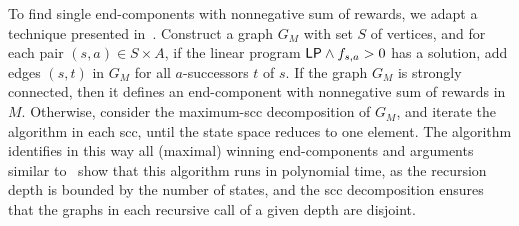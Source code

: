\documentclass{article}
\newcommand{\LP}{{\sf LP}}
\begin{document}
\smallskip{}
To find single end-components with nonnegative sum of rewards, we adapt a 
technique presented in~\cite[Section~3]{KS88}. Construct a graph $G_M$ with set $S$ of vertices,
and for each pair $(s,a) \in S \times A$, if the linear program $\LP \land f_{s,a} > 0$ 
has a solution, add edges $(s,t)$ in $G_M$ for all $a$-successors $t$ of $s$.   If the graph $G_M$ is strongly connected, then it defines an end-component with nonnegative
sum of rewards in $M$. Otherwise, consider the maximum-scc decomposition of $G_M$, 
and iterate the algorithm in each scc, until the state space reduces to one element. 
The algorithm identifies in this way all (maximal) winning end-components and
arguments similar to~\cite[Theorem~3.3]{KS88} show that this algorithm runs in polynomial
time, as the recursion depth is bounded by the number of states, and the scc 
decomposition ensures that the graphs in each recursive call of a given depth 
are disjoint.
\end{document}
